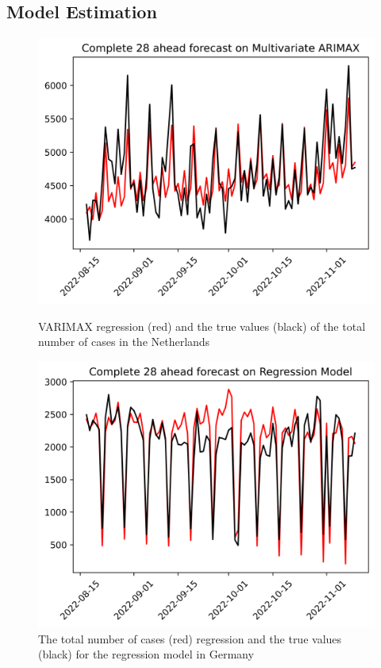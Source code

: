 \subsection{Model Estimation}
\begin{figure}
\begin{minipage}{.5\textwidth}
  \centering
  \includegraphics[width=\linewidth]{pics/28_ah/Complete_28_ahead_Multivariate ARIMAX.png}
  \caption{VARIMAX regression (red) and the true values (black) of the total number of cases in the Netherlands}
  \label{fig:ARIMAX 28 ahead}
\end{minipage}
\begin{minipage}{.5\textwidth}
  \centering
  \includegraphics[width=\linewidth]{pics/28_ah/DE_Complete_28_ahead_Regression Model.png}
  \caption{The total number of cases (red) regression and the true values (black) for the regression model in Germany}
  \label{fig:DE regression model}
\end{minipage}
\end{figure}

